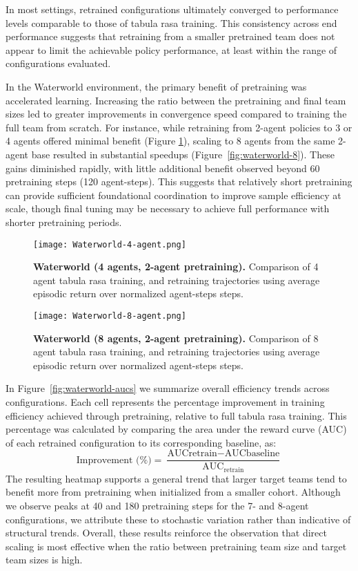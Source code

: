 \documentclass{article}
\begin{document}
In most settings, retrained configurations ultimately converged to 
performance levels comparable to those of tabula rasa training.
This consistency across end performance suggests that retraining from a smaller 
pretrained team does not appear to limit the achievable policy performance, 
at least within the range of configurations evaluated.

In the Waterworld environment, the primary benefit of pretraining was accelerated learning. 
Increasing the ratio between the pretraining and final team sizes led to greater improvements 
in convergence speed compared to training the full team from scratch. For instance, 
while retraining from 2-agent policies to 3 or 4 agents offered minimal benefit 
(Figure \ref{fig:waterworld-4}), scaling to 8 agents from the same 2-agent base resulted in 
substantial speedups (Figure~\ref{fig:waterworld-8}). These gains diminished rapidly, 
with little additional benefit observed beyond 60 pretraining steps (120 agent-steps).
This suggests that relatively short pretraining can provide sufficient foundational 
coordination to improve sample efficiency at scale, though final tuning may 
be necessary to achieve full performance with shorter pretraining periods.

\begin{figure}[!h]
    \centering
    \texttt{[image: Waterworld-4-agent.png]}
    \caption{\textbf{Waterworld (4 agents, 2-agent pretraining).} Comparison of 
    4 agent tabula rasa training, and retraining trajectories using average 
    episodic return over normalized agent-steps steps.}
    \label{fig:waterworld-4}
\end{figure}

\begin{figure}[!h]
    \centering
    \texttt{[image: Waterworld-8-agent.png]}
    \caption{\textbf{Waterworld (8 agents, 2-agent pretraining).} Comparison of 
    8 agent tabula rasa training, and retraining trajectories using average 
    episodic return over normalized agent-steps steps.}
\end{figure}

In Figure~\ref{fig:waterworld-aucs} we summarize overall efficiency trends across configurations. 
Each cell represents the percentage improvement in training efficiency 
achieved through pretraining, relative to full tabula rasa training.
This percentage was calculated by comparing the area under the reward curve 
(AUC) of each retrained configuration to its corresponding baseline, as:
\[
    \text{Improvement (\%)} 
    = \frac{\text{AUC}{\text{retrain}} - \text{AUC}{\text{baseline}}}{\text{AUC}_{\text{retrain}}}
\]
The resulting heatmap supports a general trend that larger target teams tend to 
benefit more from pretraining when initialized from a smaller cohort.
Although we observe peaks at 40 and 180 pretraining steps for the 7- and 8-agent configurations, 
we attribute these to stochastic variation rather than indicative of structural trends.
Overall, these results reinforce the observation that direct scaling is most effective 
when the ratio between pretraining team size and target team sizes is high.
\end{document}
